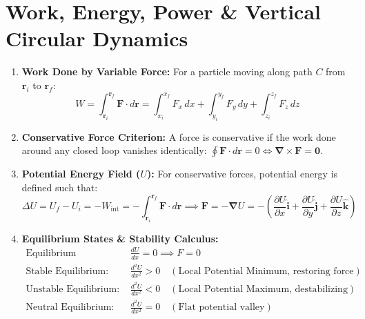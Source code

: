 \documentclass[10pt,a4paper]{article}
\begin{document}
\section{Work, Energy, Power \& Vertical Circular Dynamics}

\begin{conceptbox}
\begin{enumerate}[leftmargin=*]
  \item \textbf{Work Done by Variable Force:} For a particle moving along path $C$ from $\mathbf{r}_i$ to $\mathbf{r}_f$:
  \begin{equation}
    W = \int_{\mathbf{r}_i}^{\mathbf{r}_f} \mathbf{F} \cdot d\mathbf{r} = \int_{x_i}^{x_f} F_x\,dx + \int_{y_i}^{y_f} F_y\,dy + \int_{z_i}^{z_f} F_z\,dz
  \end{equation}
  \item \textbf{Conservative Force Criterion:} A force is conservative if the work done around any closed loop vanishes identically: $\oint \mathbf{F}\cdot d\mathbf{r} = 0 \iff \boldsymbol{\nabla}\times\mathbf{F} = \mathbf{0}$.
  \item \textbf{Potential Energy Field ($U$):} For conservative forces, potential energy is defined such that:
  \begin{equation}
    \Delta U = U_f - U_i = -W_{\text{int}} = -\int_{\mathbf{r}_i}^{\mathbf{r}_f} \mathbf{F}\cdot d\mathbf{r} \implies \mathbf{F} = -\boldsymbol{\nabla}U = -\left(\frac{\partial U}{\partial x}\hat{\mathbf{i}} + \frac{\partial U}{\partial y}\hat{\mathbf{j}} + \frac{\partial U}{\partial z}\hat{\mathbf{k}}\right)
  \end{equation}
  \item \textbf{Equilibrium States \& Stability Calculus:}
  \begin{align}
    \text{Equilibrium Condition: } &\frac{dU}{dx} = 0 \implies F = 0 \\
    \text{Stable Equilibrium: } &\frac{d^2 U}{dx^2} > 0 \quad (\text{Local Potential Minimum, restoring force}) \\
    \text{Unstable Equilibrium: } &\frac{d^2 U}{dx^2} < 0 \quad (\text{Local Potential Maximum, destabilizing}) \\
    \text{Neutral Equilibrium: } &\frac{d^2 U}{dx^2} = 0 \quad (\text{Flat potential valley})
  \end{align}
\end{enumerate}
\end{conceptbox}
\end{document}
